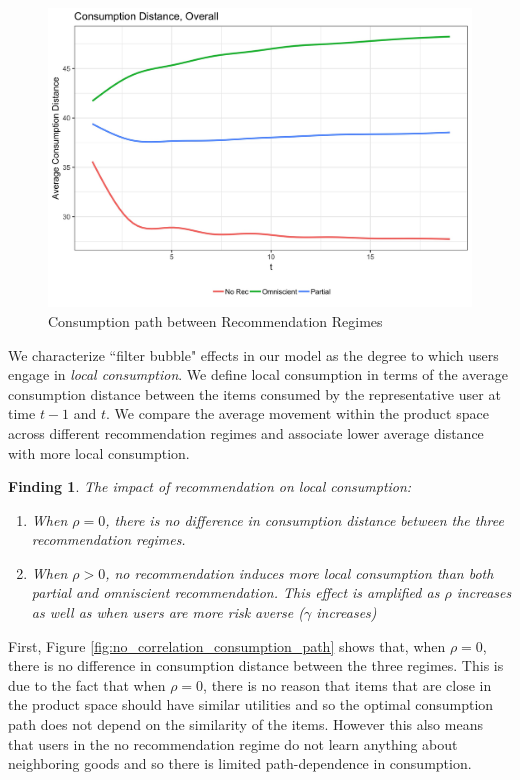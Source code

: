 \documentclass[sigconf]{acmart}
\newtheorem{finding}{Finding}
\begin{document}
\begin{figure}
\includegraphics[scale=0.1]{figures/consumption_dist_N_200T_20_overall}
\caption{Consumption path between Recommendation Regimes}
\label{fig:consumption_path_between_regimes}
\end{figure}

We characterize ``filter bubble" effects in our model as the degree to which users engage in \textit{local consumption}. We define local consumption in terms of the average consumption distance between the items consumed by the representative user at time $t-1$ and $t$. We compare the average movement within the product space across different recommendation regimes and associate lower average distance with more local consumption.

\begin{finding}\label{finding_local_consumption}
The impact of recommendation on local consumption:
\begin{enumerate}
\item When $\rho = 0$, there is no difference in consumption distance between the three recommendation regimes.
\item When $\rho > 0$, no recommendation induces more local consumption than both partial and omniscient recommendation. This effect is amplified as $\rho$ increases as well as when users are more risk averse ($\gamma$ increases)
\end{enumerate}
\end{finding}

First, Figure \ref{fig:no_correlation_consumption_path} shows that, when $\rho = 0$, there is no difference in consumption distance between the three regimes. This is due to the fact that when $\rho = 0$, there is no reason that items that are close in the product space should have similar utilities and so the optimal consumption path does not depend on the similarity of the items. However this also means that users in the no recommendation regime do not learn anything about neighboring goods and so there is limited path-dependence in consumption.
\end{document}
